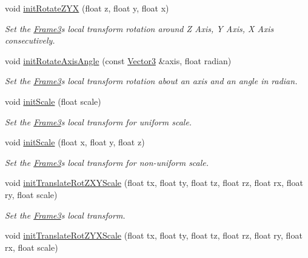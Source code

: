 \begin{DoxyCompactItemize}
void \hyperlink{class_i_dream_sky_1_1_frame3_a53c21c0b5e6d17a5ee15315ccb27c658}{init\+Rotate\+Z\+YX} (float z, float y, float x)
\begin{DoxyCompactList}\small\item\em Set the \hyperlink{class_i_dream_sky_1_1_frame3}{Frame3}\textquotesingle{}s local transform rotation around Z Axis, Y Axis, X Axis consecutively. \end{DoxyCompactList}\item 
void \hyperlink{class_i_dream_sky_1_1_frame3_af752b16366cbad81f44b9120f4cfb2dc}{init\+Rotate\+Axis\+Angle} (const \hyperlink{class_i_dream_sky_1_1_vector3}{Vector3} \&axis, float radian)
\begin{DoxyCompactList}\small\item\em Set the \hyperlink{class_i_dream_sky_1_1_frame3}{Frame3}\textquotesingle{}s local transform rotation about an axis and an angle in radian. \end{DoxyCompactList}\item 
void \hyperlink{class_i_dream_sky_1_1_frame3_af52afff1c5244fe1304cfd2ce858dcde}{init\+Scale} (float scale)
\begin{DoxyCompactList}\small\item\em Set the \hyperlink{class_i_dream_sky_1_1_frame3}{Frame3}\textquotesingle{}s local transform for uniform scale. \end{DoxyCompactList}\item 
void \hyperlink{class_i_dream_sky_1_1_frame3_a35c7e0ad809c4e13e799f317459bb8c1}{init\+Scale} (float x, float y, float z)
\begin{DoxyCompactList}\small\item\em Set the \hyperlink{class_i_dream_sky_1_1_frame3}{Frame3}\textquotesingle{}s local transform for non-\/uniform scale. \end{DoxyCompactList}\item 
void \hyperlink{class_i_dream_sky_1_1_frame3_a14b19e545aa169917b00187448a10573}{init\+Translate\+Rot\+Z\+X\+Y\+Scale} (float tx, float ty, float tz, float rz, float rx, float ry, float scale)
\begin{DoxyCompactList}\small\item\em Set the \hyperlink{class_i_dream_sky_1_1_frame3}{Frame3}\textquotesingle{}s local transform. \end{DoxyCompactList}\item 
void \hyperlink{class_i_dream_sky_1_1_frame3_a92f9d0ce60fc7cadc2d4b7e7179af622}{init\+Translate\+Rot\+Z\+Y\+X\+Scale} (float tx, float ty, float tz, float rz, float ry, float rx, float scale)

\end{DoxyCompactItemize}
